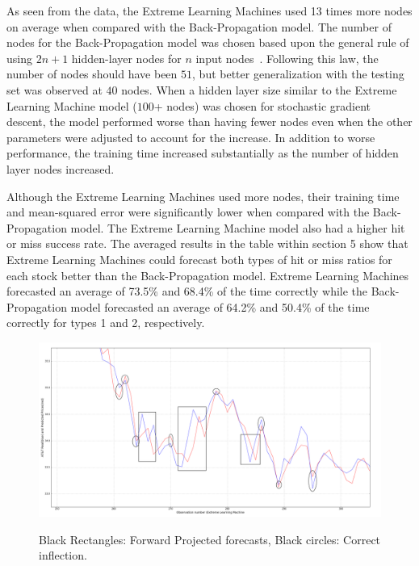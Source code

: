 As seen from the data, the Extreme Learning Machines used 13 times more nodes on average when compared with the Back-Propagation model.
The number of nodes for the Back-Propagation model was chosen based upon the general rule of using $2n+1$ hidden-layer nodes for $n$ input nodes\ \citep{Tikhomirov:1991}.
Following this law, the number of nodes should have been $51$, but better generalization with the testing set was observed at $40$ nodes.
When a hidden layer size similar to  the Extreme Learning Machine model ($100$+ nodes) was chosen for stochastic gradient descent, the model performed worse than having fewer nodes even when the other parameters were adjusted to account for the increase.
In addition to worse performance, the training time increased substantially as the number of hidden layer nodes increased.

Although the Extreme Learning Machines used more nodes, their training time and mean-squared error were significantly lower when compared with the Back-Propagation model.
The Extreme Learning Machine model also had a higher hit or miss success rate.
The averaged results in the table within section 5 show that Extreme Learning Machines could forecast both types of hit or miss ratios for each stock better than the Back-Propagation model.
Extreme Learning Machines forecasted an average of 73.5\% and 68.4\% of the time correctly while the Back-Propagation model forecasted an average of 64.2\% and 50.4\% of the time correctly for types 1 and 2, respectively.

\begin{figure}
	\begin{center}
	\resizebox{\textwidth}{!} {
	\includegraphics{images/projecting_prices}}
	\caption{ Black Rectangles: Forward Projected forecasts, Black circles: Correct inflection. }
	\label{projected_prices}
	\end{center}
\end{figure}

